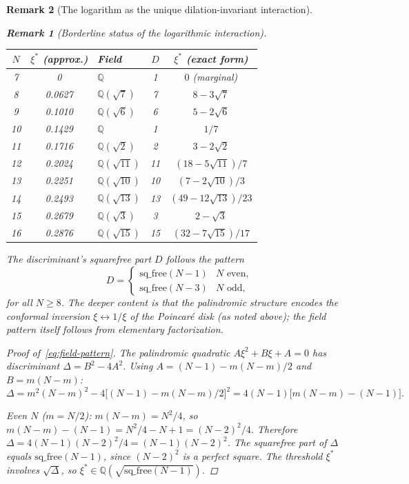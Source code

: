 \documentclass[12pt, a4paper]{article}
\newtheorem{remark}{Remark}[section]
\numberwithin{equation}{section}
\begin{document}
\begin{remark}[The logarithm as the unique dilation-invariant interaction]
\begin{remark}[Borderline status of the logarithmic interaction]
\begin{center}
\begin{tabular}{cclcc}
\toprule
$N$ & $\xi^*$ (approx.) & Field & $D$ & $\xi^*$ (exact form) \\
\midrule
7  & 0 & $\mathbb{Q}$ & 1 & $0$ (marginal) \\
8  & 0.0627 & $\mathbb{Q}(\sqrt{7})$ & 7 & $8 - 3\sqrt{7}$ \\
9  & 0.1010 & $\mathbb{Q}(\sqrt{6})$ & 6 & $5 - 2\sqrt{6}$ \\
10 & 0.1429 & $\mathbb{Q}$ & 1 & $1/7$ \\
11 & 0.1716 & $\mathbb{Q}(\sqrt{2})$ & 2 & $3 - 2\sqrt{2}$ \\
12 & 0.2024 & $\mathbb{Q}(\sqrt{11})$ & 11 & $(18 - 5\sqrt{11})/7$ \\
13 & 0.2251 & $\mathbb{Q}(\sqrt{10})$ & 10 & $(7 - 2\sqrt{10})/3$ \\
14 & 0.2493 & $\mathbb{Q}(\sqrt{13})$ & 13 & $(49 - 12\sqrt{13})/23$ \\
15 & 0.2679 & $\mathbb{Q}(\sqrt{3})$ & 3 & $2 - \sqrt{3}$ \\
16 & 0.2876 & $\mathbb{Q}(\sqrt{15})$ & 15 & $(32 - 7\sqrt{15})/17$ \\
\bottomrule
\end{tabular}
\end{center}

\noindent
The discriminant's squarefree part $D$ follows the pattern
\begin{equation}\label{eq:field-pattern}
  D = \begin{cases}
    \mathrm{sq\_free}(N-1) & N \text{ even}, \\
    \mathrm{sq\_free}(N-3) & N \text{ odd},
  \end{cases}
\end{equation}
for all $N \ge 8$.  The deeper content is that the palindromic
structure encodes the conformal inversion
$\xi \leftrightarrow 1/\xi$ of the Poincar\'e disk (as noted above);
the field pattern itself follows from elementary factorization.

\begin{proof}[Proof of~\eqref{eq:field-pattern}]
The palindromic quadratic $A\xi^2 + B\xi + A = 0$ has discriminant
$\Delta = B^2 - 4A^2$.  Using $A = (N{-}1) - m(N{-}m)/2$ and
$B = m(N{-}m)$:
\[
  \Delta = m^2(N{-}m)^2 - 4\bigl[(N{-}1) - m(N{-}m)/2\bigr]^2
  = 4(N{-}1)\bigl[m(N{-}m) - (N{-}1)\bigr].
\]

\emph{Even $N$ ($m = N/2$):}
$m(N{-}m) = N^2/4$, so
$m(N{-}m) - (N{-}1) = N^2/4 - N + 1 = (N{-}2)^2/4$.
Therefore
$\Delta = 4(N{-}1)(N{-}2)^2/4 = (N{-}1)(N{-}2)^2$.
The squarefree part of $\Delta$ equals
$\mathrm{sq\_free}(N{-}1)$, since $(N{-}2)^2$ is a perfect square.
The threshold $\xi^*$ involves $\sqrt\Delta$, so
$\xi^* \in \mathbb{Q}(\sqrt{\mathrm{sq\_free}(N{-}1)})$.


\end{proof}
\end{remark}
\end{remark}
\end{document}
